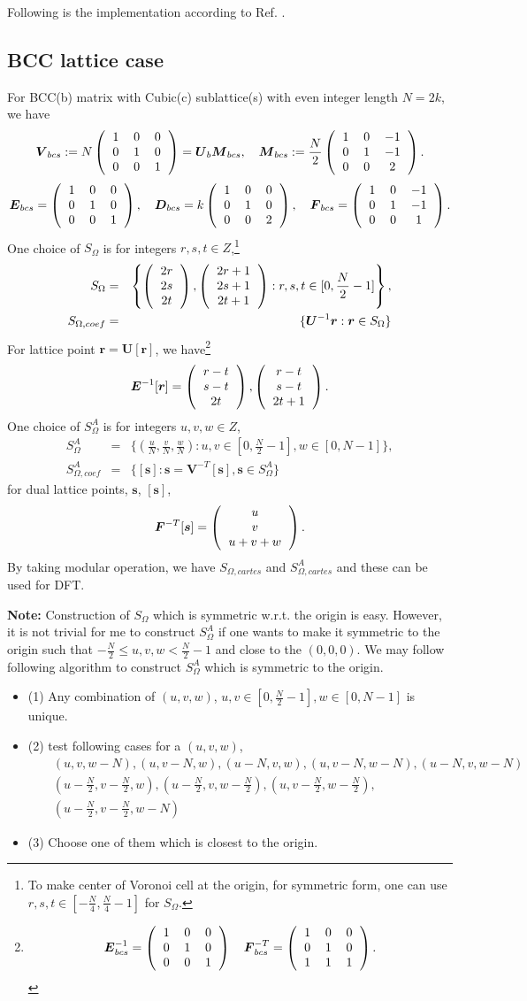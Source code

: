\documentclass[10pt]{book}
\def\bm{\boldsymbol}
\newcommand{\bea}{\begin{eqnarray}}
\newcommand{\eea}{\end{eqnarray}}
\newcommand{\no}{\nonumber \\}
\def\vr{{\bm r}}
\newcommand{\colmthr}[3]
{\left(\begin{tabular}{c} {$#1$}\\{$#2$}\\{$#3$}\end{tabular}\right)}
\newcommand{\threedmat}[9]
{\left(\begin{tabular}{ccc} {$#1$}&{$#2$}&{$#3$} \\
		{$#4$}&{$#5$}&{$#6$}\\
		{$#7$}&{$#8$}&{$#9$}\\
	    \end{tabular}\right)}
\begin{document}
Following is the implementation according to Ref. \cite{Zheng}.

\subsection{BCC lattice case}
For  BCC(b) matrix with Cubic(c) sublattice(s) with even integer length $N=2k$, we have
\bea 
{\bm V}_{bcs}:=N \threedmat{1}{0}{0}{0}{1}{0}{0}{0}{1}={\bm U}_b{\bm M}_{bcs},\quad 
{\bm M}_{bcs}:=\frac{N}{2} \threedmat{1}{0}{-1}{0}{1}{-1}{0}{0}{2}.
\eea 
\bea 
{\bm E}_{bcs}=\threedmat{1}{0}{0}{0}{1}{0}{0}{0}{1},\quad 
{\bm D}_{bcs}=k\threedmat{1}{0}{0}{0}{1}{0}{0}{0}{2},\quad 
{\bm F}_{bcs}=\threedmat{1}{0}{-1}{0}{1}{-1}{0}{0}{1}. 
\eea 
One choice of $S_{\Omega}$ is for integers $r,s,t\in Z$,\footnote{
	To make center of Voronoi cell at the origin, for symmetric form, 
    one can use $r,s,t\in [-\frac{N}{4},\frac{N}{4}-1]$ for $S_\Omega$.
} 
\bea 
S_{\Omega}&=&\left\{ \colmthr{2r}{2s}{2t},\colmthr{2r+1}{2s+1}{2t+1} : r,s,t \in [0,\frac{N}{2}-1] \right\},\no 
S_{\Omega,coef}&=&\{ {\bm U}^{-1}{\bm r} : {\bm r}\in S_\Omega\} 
\eea  
For lattice point $\vr={\bm U}[\vr]$, we have\footnote{
 $$ {\bm E}^{-1}_{bcs}= \threedmat{1}{0}{0}{0}{1}{0}{0}{0}{1} \quad 
 {\bm F}^{-T}_{bcs}= \threedmat{1}{0}{0}{0}{1}{0}{1}{1}{1}.$$

}  
\bea 
{\bm E}^{-1}[\vr]=\colmthr{r-t}{s-t}{2t }, \colmthr{r-t}{s-t}{2t+1}.
\eea 
One choice of $S^A_\Omega$ is for integers $u,v,w\in Z$,
\bea 
S^A_\Omega&=& \{ (\frac{u}{N},\frac{v}{N},\frac{w}{N}) :  u,v \in [0,\frac{N}{2}-1], w\in [0,N -1] \}, \no 
S^A_{\Omega,coef}&=& \{ [{\bm s}] : {\bm s}={\bm V}^{-T}[{\bm s}],{\bm s}\in  S^A_\Omega \} 
\eea 
for dual lattice points, ${\bm s}$, $[{\bm s}]$,   
\bea 
{\bm F}^{-T}[{\bm s}]=\colmthr{u}{v}{u+v+w}.
\eea  
By taking modular operation, we have $S_{\Omega,cartes}$ and $S^A_{\Omega,cartes}$ and these
can be used for DFT. 

{\bf Note:} Construction of $S_{\Omega}$ which is symmetric w.r.t. the origin is easy.
However, it is not trivial for me to construct $S^A_\Omega$ if one wants to make it symmetric to the origin
such that  $-\frac{N}{2}\leq u,v,w< \frac{N}{2}-1 $ and close to the $(0,0,0)$. 
We may follow following algorithm to construct $S^A_\Omega$ which is symmetric to the origin.
\begin{itemize}
	\item (1) Any combination of $(u,v,w)$, $u,v \in [0,\frac{N}{2}-1], w\in [0,N -1]$ is unique. 
	
	\item (2) test following cases for a $(u,v,w)$,
	\bea 
	& &(u,v,w-N),(u,v-N,w),(u-N,v,w),(u,v-N,w-N),(u-N,v,w-N) \no 
	& & (u-\frac{N}{2},v-\frac{N}{2},w),
	    (u-\frac{N}{2},v,w-\frac{N}{2}),(u,v-\frac{N}{2},w-\frac{N}{2}), \no 
	& & (u-\frac{N}{2},v-\frac{N}{2},w-N)
	\eea     
	\item (3) Choose one of them which is closest to the origin. 
\end{itemize}
\end{document}
